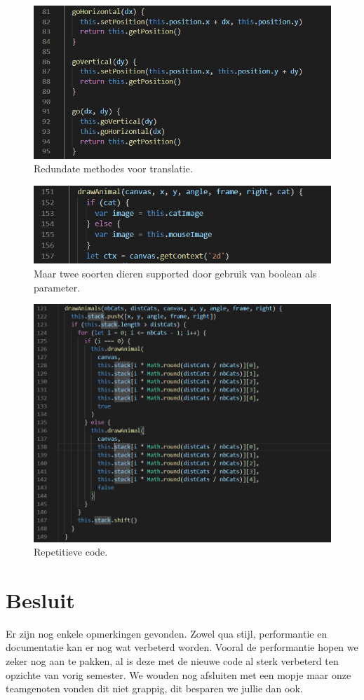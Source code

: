 \documentclass[a4paper,11pt]{article}
\begin{document}
\begin{figure}
	\centering
	\includegraphics{img/go.png}
	\caption{Redundate methodes voor translatie.}
	\label{go}
\end{figure}

\begin{figure}
	\centering
	\includegraphics{img/animals.png}
	\caption{Maar twee soorten dieren supported door gebruik van boolean als parameter.}
	\label{boolAnimal}
\end{figure}

\begin{figure}
	\centering
	\includegraphics{img/repetitive.png}
	\caption{Repetitieve code.}
	\label{repetitive}
\end{figure}

\section{Besluit}
Er zijn nog enkele opmerkingen gevonden. Zowel qua stijl, performantie en documentatie kan er nog wat verbeterd worden. Vooral de performantie hopen we zeker nog aan te pakken, al is deze met de nieuwe code al sterk verbeterd ten opzichte van vorig semester. We wouden nog afsluiten met een mopje maar onze teamgenoten vonden dit niet grappig, dit besparen we jullie dan ook.
\end{document}
